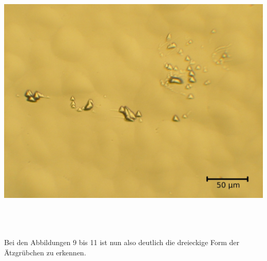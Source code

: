 \documentclass[german,  %
parskip=full,  %
]{scrartcl}
\begin{document}
\begin{minipage}{0.45\textwidth}\centering
\includegraphics[scale=0.08]{Si_3Sch_15s_25x_00017}
\end{minipage}
\\\\\\
Bei den Abbildungen 9 bis 11 ist nun also deutlich die dreieckige Form der Ätzgrübchen zu erkennen.
\end{document}
